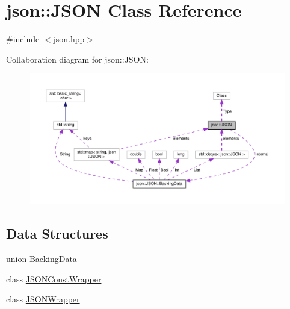 \hypertarget{classjson_1_1_j_s_o_n}{}\section{json\+:\+:J\+S\+ON Class Reference}
\label{classjson_1_1_j_s_o_n}


{\ttfamily \#include $<$json.\+hpp$>$}



Collaboration diagram for json\+:\+:J\+S\+ON\+:
\nopagebreak
\begin{figure}[H]
\begin{center}
\leavevmode
\includegraphics[width=350pt]{classjson_1_1_j_s_o_n__coll__graph}
\end{center}
\end{figure}
\subsection*{Data Structures}
\begin{DoxyCompactItemize}
\item 
union \mbox{\hyperlink{unionjson_1_1_j_s_o_n_1_1_backing_data}{Backing\+Data}}
\item 
class \mbox{\hyperlink{classjson_1_1_j_s_o_n_1_1_j_s_o_n_const_wrapper}{J\+S\+O\+N\+Const\+Wrapper}}
\item 
class \mbox{\hyperlink{classjson_1_1_j_s_o_n_1_1_j_s_o_n_wrapper}{J\+S\+O\+N\+Wrapper}}
\end{DoxyCompactItemize}
